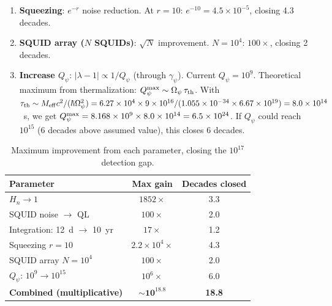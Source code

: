 \documentclass[11pt,twocolumn]{article}
\newcommand{\lam}{\lambda}
\newcommand{\Opsi}{\Omega_\psi}
\newcommand{\gpsi}{\gamma_\psi}
\newcommand{\Meff}{M_{\rm eff}}
\newcommand{\ee}[1]{\times 10^{#1}}
\newcommand{\Qpsi}{Q_\psi}
\newcommand{\Heff}{H_n}
\theoremstyle{definition}
\theoremstyle{remark}
\begin{document}
\begin{enumerate}
\item \textbf{Squeezing}: $e^{-r}$ noise reduction. At $r = 10$:
  $e^{-10} = 4.5\ee{-5}$, closing 4.3 decades.

\item \textbf{SQUID array ($N$ SQUIDs)}: $\sqrt{N}$ improvement.
  $N = 10^4$: $100\times$, closing 2 decades.

\item \textbf{Increase $\Qpsi$}: $|\lam-1| \propto 1/\Qpsi$ (through $\gpsi$).
  Current $\Qpsi = 10^9$. Theoretical maximum from thermalization:
  $\Qpsi^{\rm max} \sim \Opsi\,\tau_{\rm th}$. With
  $\tau_{\rm th} \sim \Meff c^2/(\hbar\Opsi^2) = 6.27\ee{4}\times
  9\ee{16}/(1.055\ee{-34}\times 6.67\ee{19}) = 8.0\ee{14}$~s,
  we get $\Qpsi^{\rm max} = 8.168\ee{9}\times 8.0\ee{14} = 6.5\ee{24}$.
  If $\Qpsi$ could reach $10^{15}$ (6 decades above assumed value),
  this closes 6 decades.
\end{enumerate}

\begin{table}[H]
\caption{Maximum improvement from each parameter, closing the
$10^{17}$ detection gap.}
\label{tab:parameter_gains}
\begin{tabular}{@{}lcc@{}}
\toprule
Parameter & Max gain & Decades closed \\
\midrule
$\Heff \to 1$ & $1852\times$ & 3.3 \\
SQUID noise $\to$ QL & $100\times$ & 2.0 \\
Integration: 12~d $\to$ 10~yr & $17\times$ & 1.2 \\
Squeezing $r = 10$ & $2.2\ee{4}\times$ & 4.3 \\
SQUID array $N = 10^4$ & $100\times$ & 2.0 \\
$\Qpsi$: $10^9 \to 10^{15}$ & $10^6\times$ & 6.0 \\
\midrule
\textbf{Combined (multiplicative)} & $\mathbf{\sim 10^{18.8}}$ & \textbf{18.8} \\
\bottomrule
\end{tabular}
\end{table}
\end{document}
